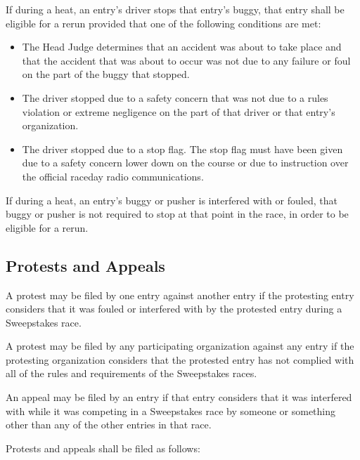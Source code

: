 	If during a heat, an entry’s driver stops that entry’s buggy, that entry shall be eligible for a rerun provided that one of the following conditions are met:

		\begin{itemize}

			\item The Head Judge determines that an accident was about to take place and that the accident that was about to occur was not due to any failure or foul on the part of the buggy that stopped.

			\item The driver stopped due to a safety concern that was not due to a rules violation or extreme negligence on the part of that driver or that entry's organization.

			\item The driver stopped due to a stop flag. The stop flag must have been given due to a safety concern lower down on the course or due to instruction over the official raceday radio communications.

		\end{itemize}

	If during a heat, an entry's buggy or pusher is interfered with or fouled, that buggy or pusher is not required to stop at that point in the race, in order to be eligible for a rerun.

\subsection{Protests and Appeals}

	A protest may be filed by one entry against another entry if the protesting entry considers that it was fouled or interfered with by the protested entry during a Sweepstakes race.

	A protest may be filed by any participating organization against any entry if the protesting organization considers that the protested entry has not complied with all of the rules and requirements of the Sweepstakes races.

	An appeal may be filed by an entry if that entry considers that it was interfered with while it was competing in a Sweepstakes race by someone or something other than any of the other entries in that race.

	Protests and appeals shall be filed as follows:

